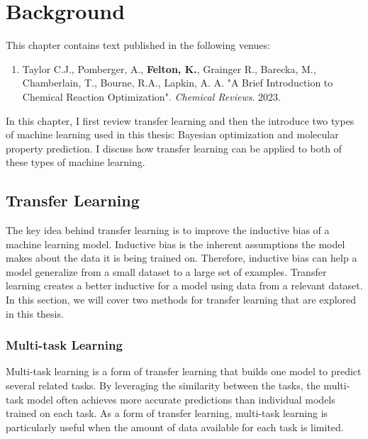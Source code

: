 \chapter{Background}\label{ch:background}

This chapter contains text published in the following venues:

\begin{enumerate}
\item Taylor C.J., Pomberger, A., \textbf{Felton, K.}, Grainger R., Barecka, M., Chamberlain, T., Bourne, R.A., Lapkin, A. A. "A Brief Introduction to Chemical Reaction Optimization". \textit{Chemical Reviews}. 2023.
\end{enumerate}

In this chapter, I first review transfer learning and then the introduce two types of machine learning used in this thesis: Bayesian optimization and molecular property prediction. I discuss how transfer learning can be applied to both of these types of machine learning.

\section{Transfer Learning}

The key idea behind transfer learning is to improve the inductive bias of a machine learning model. Inductive bias is the inherent assumptions the model makes about the data it is being trained on. Therefore, inductive bias can help a model generalize from a small dataset to a large set of examples. Transfer learning creates a better inductive for a model using data from a relevant dataset. In this section, we will cover two methods for transfer learning that are explored in this thesis. 

\subsection{Multi-task Learning}

Multi-task learning is a form of transfer learning that builds one model to predict several related tasks. By leveraging the similarity between the tasks, the multi-task model often achieves more accurate predictions than individual models trained on each task.\cite{Simes2018} As a form of transfer learning, multi-task learning is particularly useful when the amount of data available for each task is limited.


